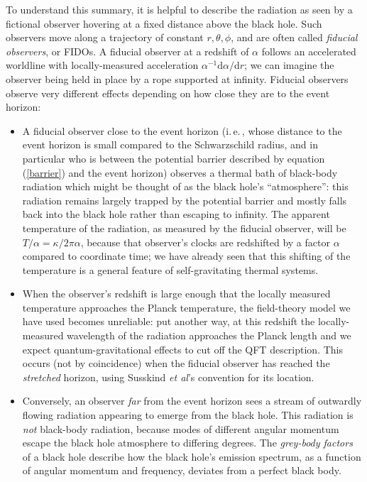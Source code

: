 \documentclass[12pt]{article}
\newcommand{\iec}{\mbox{i.\,e.\,}}
\begin{document}
 To understand this summary, it is helpful to describe the radiation as seen by a fictional observer hovering at a fixed distance above the black hole. Such observers move along a trajectory of constant $r,\theta,\phi$, and are often called \emph{fiducial observers}, or FIDOs. A fiducial observer at a redshift of $\alpha$ follows an accelerated worldline with locally-measured acceleration $\alpha^{-1}\mathrm{d}\alpha/\mathrm{d}r$; we can imagine the observer being held in place by a rope supported at infinity. Fiducial observers observe very different effects depending on how close they are to the event horizon:
 \begin{itemize}
 \item A fiducial observer close to the event horizon (\iec, whose distance to the event horizon is small compared to the Schwarzschild radius, and in particular who is between the potential barrier described by equation (\ref{barrier}) and the event horizon) observes a thermal bath of black-body radiation which might be thought of as the black hole's ``atmosphere'': this radiation remains largely trapped by the potential barrier and mostly falls back into the black hole rather than escaping to infinity. The apparent temperature of the radiation, as measured by the fiducial observer, will be $T/\alpha= \kappa/2\pi \alpha$, because that observer's clocks are redshifted by a factor $\alpha$ compared to coordinate time; we have already seen that this shifting of the temperature is a general feature of self-gravitating thermal systems.
 
\item When the observer's redshift is large enough that the locally measured temperature approaches the Planck temperature, the field-theory model we have used becomes unreliable: put another way, at this redshift the locally-measured wavelength of the radiation approaches the Planck length and we expect quantum-gravitational effects to cut off the QFT description. This occurs (not by coincidence) when the fiducial observer has reached the \emph{stretched} horizon, using Susskind \emph{et al}'s convention for its location. 

\item Conversely, an observer \emph{far} from the event horizon sees a stream of outwardly flowing radiation appearing to emerge from the black hole. This radiation is \emph{not} black-body radiation, because modes of different angular momentum escape the black hole atmosphere to differing degrees. The \emph{grey-body factors} of a black hole describe how the black hole's emission spectrum, as a function of angular momentum and frequency, deviates from a perfect black body.
 \end{itemize}
\end{document}
